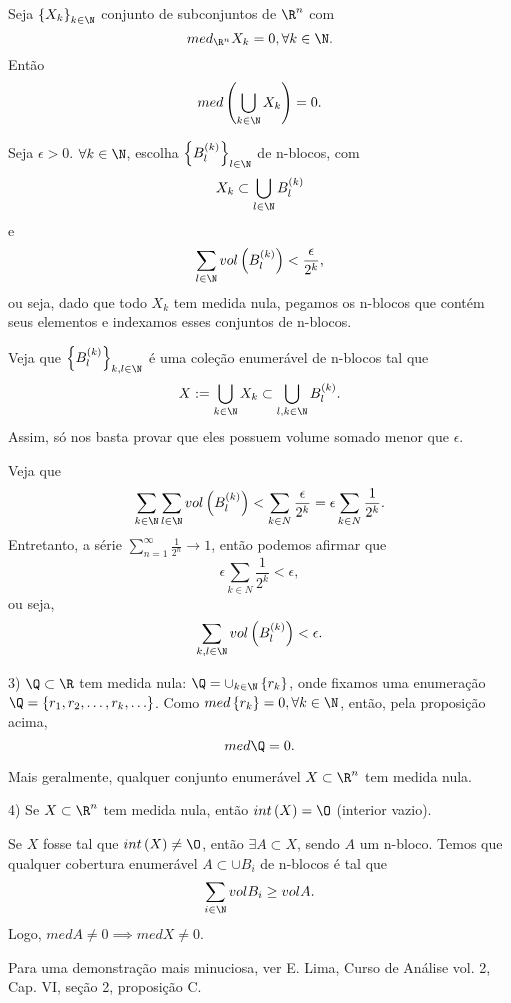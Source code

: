 \begin{prop}
    Seja $\left\{ X_k \right\}_{k\in \N}$ conjunto de subconjuntos de $\R^{n}$ com \[
    med_{\R^{n}}X_k = 0 , \forall k\in \N
    .\] Então \[
    med\left( \bigcup_{k\in \N} X_k \right) = 0
    .\] 
\end{prop}

\begin{demo}
    Seja $\epsilon>0$. $\forall k\in \N$, escolha $\left\{ B_l^{(k)} \right\}_{l\in \N}$ de n-blocos, com \[
    X_k \subset  \bigcup_{l\in \N}B_l^{(k)}
    \]  e \[
    \sum_{l\in \N} vol\left( B_l^{(k)} \right) < \frac{\epsilon}{2^{k}}
    ,\] ou seja, dado que todo $X_k$ tem medida nula, pegamos os n-blocos que contém seus elementos e indexamos esses conjuntos de n-blocos.

    Veja que $\left\{ B_l^{(k)} \right\}_{k,l \in \N}$ é uma coleção enumerável de n-blocos tal que \[
    X:= \bigcup_{k\in \N}X_k \subset \bigcup _{l,k\in \N}B_l^{(k)}
    .\] Assim, só nos basta provar que eles possuem volume somado menor que $\epsilon$.

    Veja que \[
    \sum_{k\in \N} \sum_{l\in \N} vol\left( B_l^{(k)} \right) < \sum_{k\in N} \frac{\epsilon}{2^{k}} = \epsilon\sum_{k\in N} \frac{1}{2^{k}}
.\] Entretanto, a série $\sum_{n=1}^{\infty} \frac{1}{2^{n}} \to 1$, então podemos afirmar que \[
\epsilon\sum_{k\in N} \frac{1}{2^{k}} < \epsilon
,\] ou seja, \[
\sum_{k,l \in  \N} vol\left( B_l^{(k)} \right) < \epsilon
.\] 
\end{demo}

\begin{eg}
    3) $\Q\subset \R$ tem medida nula: $\Q = \cup_{k\in \N}\left\{ r_k \right\} $, onde fixamos uma enumeração $\Q=\left\{ r_1,r_2,\ldots,r_k,\ldots \right\}$. Como $med \left\{ r_k \right\} = 0, \forall k\in \N$, então, pela proposição acima, \[
    med \Q = 0.
    \] 

    Mais geralmente, qualquer conjunto enumerável $X \subset \R^{n}$ tem medida nula.
\end{eg}

\begin{eg}
    4) Se $X \subset  \R^{n}$ tem medida nula, então $int\left( X \right) = \O$ (interior vazio).

    Se $X$ fosse tal que $int\left( X \right) \neq \O$, então $\exists A\subset X$, sendo $A$ um n-bloco. Temos que qualquer cobertura enumerável $A\subset \cup B_i$ de n-blocos é tal que \[
    \sum_{i\in \N} vol B_i \ge vol A
    .\] Logo, $med A \neq 0 \implies med X \neq 0$.

    Para uma demonstração mais minuciosa, ver E. Lima, Curso de Análise vol. 2, Cap. VI, seção 2, proposição C.
\end{eg}

